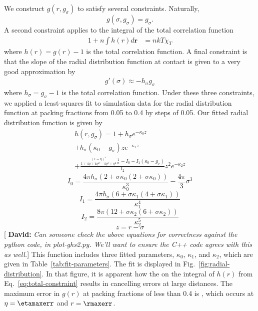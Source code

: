 \documentclass[letterpaper,twocolumn,amsmath,amssymb,pre,aps,10pt]{revtex4-1}
\newcommand{\green}[1]{{\bf \color{green} #1}}
\newcommand{\rr}{\textbf{r}}
\newcommand{\davidsays}[1]{{\color{red} [\green{David:} \emph{#1}]}}
\begin{document}
We construct $g(r, g_\sigma)$ to satisfy several constraints.  Naturally,
\begin{equation}
  g(\sigma, g_\sigma) = g_\sigma.
\end{equation}
A second constraint applies to the integral of the total correlation
function
\begin{align}
  1 + n\int h(r)d\rr &= nkT\chi_T \label{eq:total-constraint}
\end{align}
where $h(r) = g(r) - 1$ is the total correlation function.
A final constraint is that the slope of the radial distribution
function at contact is given to a very good approximation by
\begin{align}
  g'(\sigma) \approx - h_\sigma g_\sigma
\end{align}
where $h_\sigma = g_\sigma - 1$ is the total correlation function.
Under these three constraints, we applied a least-squares fit to
simulation data for the radial distribution function at packing
fractions from 0.05 to 0.4 by steps of 0.05.  Our fitted radial
distribution function is given by
\newcommand\kappaa{\kappa_0}
\newcommand\kappab{\kappa_1}
\newcommand\kappac{\kappa_2}
\begin{multline}
  h(r,g_\sigma) = 1 + h_\sigma e^{-\kappaa z} \\
  + h_\sigma(\kappaa - g_\sigma) ze^{-\kappab z} \\
  + \frac{\frac{(1-\eta)^4}{1+4\eta + 4\eta^2 - 4\eta^3 +
      \eta^4}\frac{1}{n}
    - I_0  -I_1(\kappaa - g_\sigma)}{I_2} z^2e^{-\kappac z}
\end{multline}
\begin{equation}
  I_0 = \frac{4\pi h_\sigma (2 + \sigma \kappaa (2 + \sigma \kappaa))}{\kappaa^3}
  - \frac{4\pi}{3} \sigma^3
\end{equation}
\begin{equation}
  I_1 = \frac{4\pi h_\sigma (6 + \sigma \kappab (4 + \sigma \kappab))}{\kappab^4}
\end{equation}
\begin{equation}
  I_2 = \frac{8\pi (12 + \sigma \kappac (6 + \sigma \kappac))}{\kappac^5}
\end{equation}
\begin{equation}
  z = r - \sigma
\end{equation}
\davidsays{Can someone check the above equations for correctness
  against the python code, in plot-ghs2.py.  We'll want to
  ensure the C++ code agrees with this as well.}
This function includes three fitted parameters, $\kappaa$, $\kappab$,
and $\kappac$, which are given in Table~\ref{tab:fit-parameters}.
The fit is displayed in Fig.~\ref{fig:radial-distribution}.  In that
figure, it is apparent how the on the integral of $h(r)$ from
Eq.~\ref{eq:total-constraint} results in cancelling errors at large
distances.  The maximum error in $g(r)$ at packing fractions of less
than 0.4 is \maxerr, which occurs at $\eta = \etamaxerr$ and $r =
\rmaxerr$.
\end{document}
